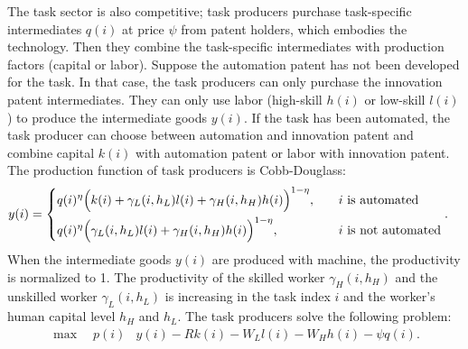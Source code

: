 \documentclass[12pt]{article}
\begin{document}
The task sector is also competitive; task producers purchase task-specific intermediates $q(i)$ at price $\psi$ from patent holders, which embodies the technology. Then they combine the task-specific intermediates with production factors (capital or labor). Suppose the automation patent has not been developed for the task. In that case, the task producers can only purchase the innovation patent intermediates. They can only use labor (high-skill $h(i)$ or low-skill $l(i)$) to produce the intermediate goods $y(i)$. If the task has been automated, the task producer can choose between automation and innovation patent and combine capital $k(i)$ with automation patent or labor with innovation patent. The production function of task producers is Cobb-Douglass:
\begin{align*}
y(i) &= 
\begin{dcases}
q(i)^{\eta}\Big(k(i) + \gamma_L(i,h_L)l(i)+\gamma_H(i,h_H)h(i)\Big)^{1-\eta} , &\quad \text{$i$ is automated}  \\
q(i)^{\eta}\Big(\gamma_L(i,h_L)l(i)+\gamma_H(i,h_H)h(i)\Big)^{1-\eta} ,&\quad \text{$i$ is not automated}
\end{dcases}. 
\end{align*}
When the intermediate goods $y(i)$ are produced with machine, the productivity is normalized to 1. The productivity of the skilled worker $\gamma_H(i,h_H)$ and the unskilled worker $\gamma_L(i,h_L)$ is increasing in the task index $i$ and the worker's human capital level $h_H$ and $h_L$. 
The task producers solve the following problem:
\begin{align*}
\max \quad  p(i)&y(i)-Rk(i)-W_Ll(i)-W_Hh(i)-\psi q(i).
\end{align*}
\end{document}
